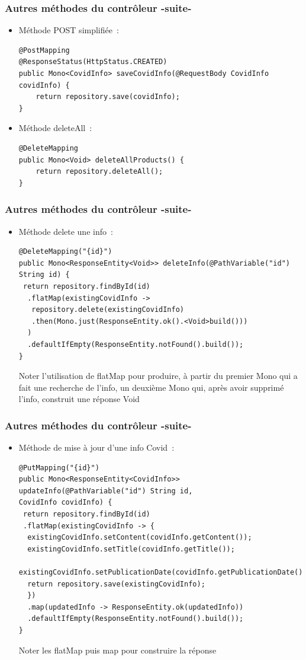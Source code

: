 \documentclass{beamer}
\begin{document}
\begin{frame}[fragile]
	\frametitle{Autres méthodes du contrôleur -suite-}
	\begin{itemize}
		\item Méthode POST simplifiée~:
\begin{lstlisting}
@PostMapping
@ResponseStatus(HttpStatus.CREATED)
public Mono<CovidInfo> saveCovidInfo(@RequestBody CovidInfo covidInfo) {
	return repository.save(covidInfo);
}
\end{lstlisting}
\item Méthode deleteAll~:
\begin{lstlisting}
@DeleteMapping
public Mono<Void> deleteAllProducts() {
	return repository.deleteAll();
}
\end{lstlisting}
	\end{itemize}
\end{frame}

\begin{frame}[fragile]
	\frametitle{Autres méthodes du contrôleur -suite-}
	\begin{itemize}
		\item Méthode delete une info~:
\begin{lstlisting}
@DeleteMapping("{id}")
public Mono<ResponseEntity<Void>> deleteInfo(@PathVariable("id") String id) {
 return repository.findById(id)
  .flatMap(existingCovidInfo ->
   repository.delete(existingCovidInfo)
   .then(Mono.just(ResponseEntity.ok().<Void>build()))
  )
  .defaultIfEmpty(ResponseEntity.notFound().build());
}
\end{lstlisting}
Noter l'utilisation de flatMap pour produire, à partir du premier Mono qui a fait une recherche de l'info, un deuxième Mono qui, après avoir supprimé l'info, construit une réponse Void
	\end{itemize}
\end{frame}

\begin{frame}[fragile]
	\frametitle{Autres méthodes du contrôleur -suite-}
	\begin{itemize}
		\item Méthode de mise à jour d'une info Covid~:
\begin{lstlisting}
@PutMapping("{id}")
public Mono<ResponseEntity<CovidInfo>> updateInfo(@PathVariable("id") String id,
CovidInfo covidInfo) {
 return repository.findById(id)
 .flatMap(existingCovidInfo -> {
  existingCovidInfo.setContent(covidInfo.getContent());
  existingCovidInfo.setTitle(covidInfo.getTitle());
  existingCovidInfo.setPublicationDate(covidInfo.getPublicationDate());
  return repository.save(existingCovidInfo);
  })
  .map(updatedInfo -> ResponseEntity.ok(updatedInfo))
  .defaultIfEmpty(ResponseEntity.notFound().build());
}
\end{lstlisting}
Noter les flatMap puis map pour construire la réponse
	\end{itemize}
\end{frame}
\end{document}
